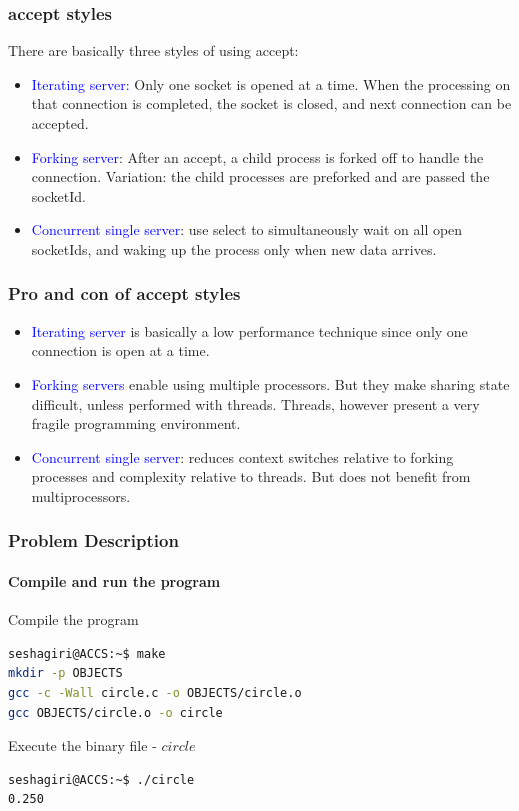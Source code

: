 \documentclass[12pt]{beamer}
\begin{document}
\begin{frame}
	\frametitle{accept styles}
	{\footnotesize
	There are basically three styles of using accept:
	\begin{itemize}
		\item \textcolor{blue}{Iterating server:} Only one socket is opened at a time. When the processing on that connection is completed, the socket is closed, and next connection can be accepted.
		\item \textcolor{blue}{Forking server}: After an accept, a child process is forked off to handle the connection. Variation: the child processes are preforked and are passed the socketId.
		\item \textcolor{blue}{Concurrent single server}: use select to simultaneously wait on all open socketIds, and waking up the process only when new data arrives.
	\end{itemize}
	}
\end{frame}

\begin{frame}
	\frametitle{Pro and con of accept styles}
	{\footnotesize

	\begin{itemize}
		\item \textcolor{blue}{Iterating server} is basically a low performance technique since
only one connection is open at a time.
		\item \textcolor{blue}{Forking servers} enable using multiple processors. But they
make sharing state difficult, unless performed with threads.
Threads, however present a very fragile programming
environment.
		\item \textcolor{blue}{Concurrent single server}: reduces context switches relative to
forking processes and complexity relative to threads. But does
not benefit from multiprocessors.
	\end{itemize}
	}
\end{frame}

\begin{frame}[fragile]
	\frametitle{Problem Description}
	\framesubtitle{Compile and run the program}
	\tiny
	\begin{block}{Compile the program}
		\begin{lstlisting}[language=bash]
seshagiri@ACCS:~$ make
mkdir -p OBJECTS
gcc -c -Wall circle.c -o OBJECTS/circle.o
gcc OBJECTS/circle.o -o circle
    	\end{lstlisting}
    \end{block}
    
	\begin{block}{Execute the binary file - $circle$}
		\begin{lstlisting}[language=bash]
seshagiri@ACCS:~$ ./circle
0.250
		\end{lstlisting}
	\end{block}
\end{frame}
\end{document}
